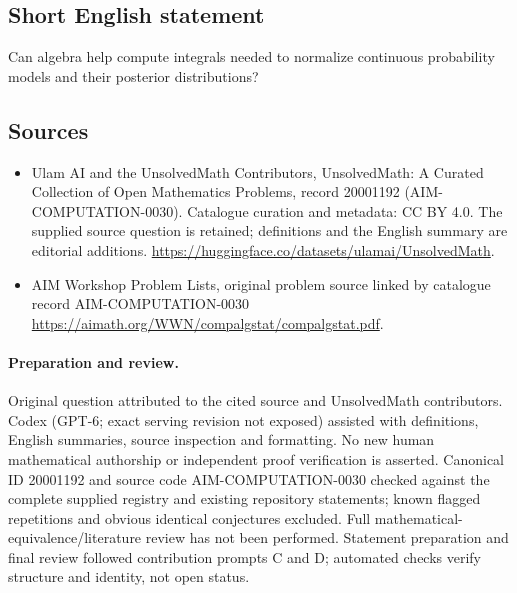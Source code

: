 \documentclass[11pt]{article}
\begin{document}
\subsection{Short English statement}
Can algebra help compute integrals needed to normalize continuous probability models and their posterior distributions?
\subsection{Sources}
\begin{itemize}
\item[\hypertarget{source:20001192:1}{S1}] Ulam AI and the UnsolvedMath Contributors, UnsolvedMath: A Curated Collection of Open Mathematics Problems, record 20001192 (AIM-COMPUTATION-0030). Catalogue curation and metadata: CC BY 4.0. The supplied source question is retained; definitions and the English summary are editorial additions.
\url{https://huggingface.co/datasets/ulamai/UnsolvedMath}.
\item[\hypertarget{source:20001192:2}{S2}] AIM Workshop Problem Lists, original problem source linked by catalogue record AIM-COMPUTATION-0030
\url{https://aimath.org/WWN/compalgstat/compalgstat.pdf}.
\end{itemize}
\paragraph{Preparation and review.}
Original question attributed to the cited source and UnsolvedMath contributors. Codex (GPT-6; exact serving revision not exposed) assisted with definitions, English summaries, source inspection and formatting. No new human mathematical authorship or independent proof verification is asserted. Canonical ID 20001192 and source code AIM-COMPUTATION-0030 checked against the complete supplied registry and existing repository statements; known flagged repetitions and obvious identical conjectures excluded. Full mathematical-equivalence/literature review has not been performed. Statement preparation and final review followed contribution prompts C and D; automated checks verify structure and identity, not open status.
\label{end:20001192}
\end{document}

